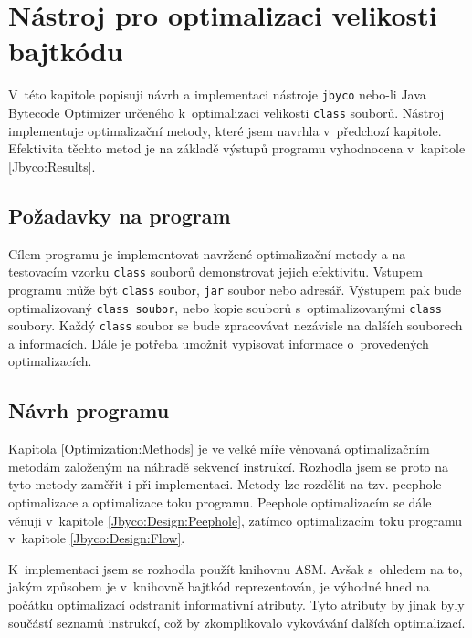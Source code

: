 \chapter{Nástroj pro optimalizaci velikosti bajtkódu}\label{Jbyco}


V~této kapitole popisuji návrh a implementaci nástroje \texttt{jbyco} nebo-li Java Bytecode Optimizer určeného k~optimalizaci velikosti \texttt{class} souborů. Nástroj implementuje optimalizační metody, které jsem navrhla v~předchozí kapitole. Efektivita těchto metod je na základě výstupů programu vyhodnocena v~kapitole \ref{Jbyco:Results}.

\section{Požadavky na program}\label{Jbyco:Requirements}

Cílem programu je implementovat navržené optimalizační metody a na testovacím vzorku \texttt{class} souborů demonstrovat jejich efektivitu. %
Vstupem programu může být \texttt{class} soubor, \texttt{jar} soubor nebo adresář. Výstupem pak bude optimalizovaný \texttt{class soubor}, nebo kopie souborů s~optimalizovanými \texttt{class} soubory. Každý \texttt{class} soubor se bude zpracovávat nezávisle na dalších souborech a informacích. Dále je potřeba umožnit vypisovat informace o~provedených optimalizacích.

\section{Návrh programu}\label{Jbyco:Design}

Kapitola \ref{Optimization:Methods} je ve velké míře věnovaná optimalizačním metodám založeným na náhradě sekvencí instrukcí. Rozhodla jsem se proto na tyto metody zaměřit i při implementaci. Metody lze rozdělit na tzv. peephole optimalizace a optimalizace toku programu. Peephole optimalizacím se dále věnuji v~kapitole \ref{Jbyco:Design:Peephole}, zatímco optimalizacím toku programu v~kapitole \ref{Jbyco:Design:Flow}. 

K~implementaci jsem se rozhodla použít knihovnu ASM. Avšak s~ohledem na to, jakým způsobem je v~knihovně bajtkód reprezentován, je výhodné hned na počátku optimalizací odstranit informativní atributy. Tyto atributy by jinak byly součástí seznamů instrukcí, což by zkomplikovalo vykovávání dalších optimalizací. 

